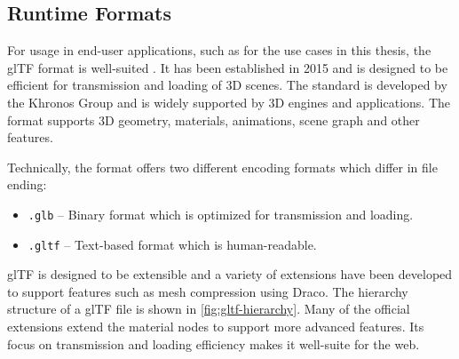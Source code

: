 \subsection*{Runtime Formats}

For usage in end-user applications, such as for the use cases in this thesis, the \gls{glTF} format is well-suited \cite{gltfSpecification}. It has been established in 2015 and is designed to be efficient for transmission and loading of 3D scenes. The standard is developed by the \gls{Khronos Group} and is widely supported by 3D engines and applications. The format supports 3D geometry, materials, animations, scene graph and other features.

Technically, the format offers two different encoding formats which differ in file ending:

\begin{itemize}
    \item{\texttt{.glb}} – Binary format which is optimized for transmission and loading.
    \item{\texttt{.gltf}} – Text-based format which is human-readable.
\end{itemize}

\gls{glTF} is designed to be extensible and a variety of extensions have been developed to support features such as mesh compression using Draco. The hierarchy structure of a \gls{glTF} file is shown in \autoref{fig:gltf-hierarchy}. Many of the official extensions extend the material nodes to support more advanced features. Its focus on transmission and loading efficiency makes it well-suite for the web.


